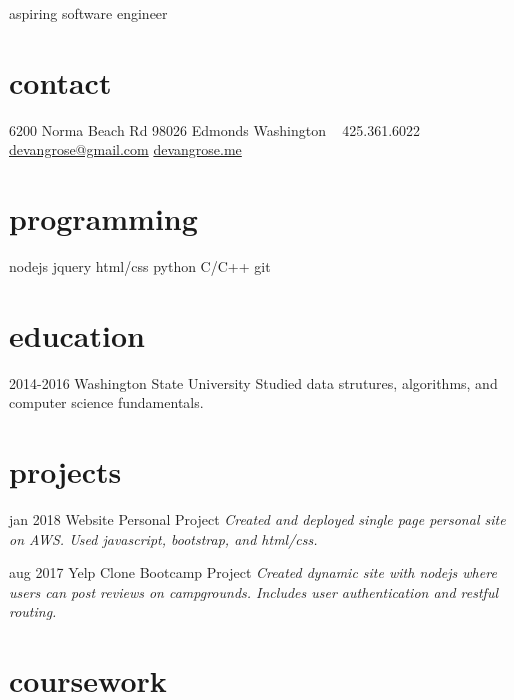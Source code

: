 \documentclass[]{friggeri-cv}
\begin{document}
       {aspiring software engineer}


\begin{aside}
  \section{contact}
    6200 Norma Beach Rd
    98026 Edmonds
    Washington
    ~
    425.361.6022
    \href{mailto:devangrose@gmail.com}{devangrose@gmail.com}
    \href{http://devangrose.me}{devangrose.me}
    ~
    \href{https://www.linkedin.com/in/devan-grose-6506b1158}{\faLinkedin} \href{https://www.github.com/devangrose}{\faGithub}
  \section{programming}
    nodejs
    jquery
    html/css
    python
    C/C++
    git
\end{aside}

\section{education}

\begin{entrylist}
  \entry
    {2014-2016}
    {Washington State University}
    {}
    {Studied data strutures, algorithms, and computer science fundamentals.}

\end{entrylist}

\section{projects}

\begin{entrylist}
  \entry
    {jan 2018}
    {Website}
    {Personal Project}
    {\emph{Created and deployed single page personal site on AWS. Used javascript, bootstrap, and html/css.}}

  \entry
    {aug 2017}
    {Yelp Clone}
    {Bootcamp Project}
    {\emph{Created dynamic site with nodejs where users can post reviews on campgrounds. Includes user authentication and restful routing.}}
\end{entrylist}

\section{coursework}
\end{document}
